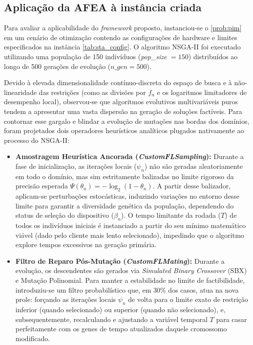 \subsection{Aplicação da AFEA à instância criada}
\label{subsec:aplicacao_AFEA}

Para avaliar a aplicabilidade do \textit{framework} proposto, instanciou-se o \ref{prob:pim} em um cenário de otimização contendo as configurações de hardware e limites especificados na instância \cref{tab:sta_config}. O algoritmo NSGA-II foi executado utilizando uma população de 150 indivíduos (\textit{pop\_size} $= 150$) distribuídos ao longo de 500 gerações de evolução ($n\_gen = 500$). 

Devido à elevada dimensionalidade contínuo-discreta do espaço de busca e à não-linearidade das restrições (como as divisões por $f_n$ e os logaritmos limitadores de desempenho local), observou-se que algoritmos evolutivos multivariáveis puros tendem a apresentar uma vasta dispersão na geração de soluções factíveis. Para contornar esse gargalo e blindar a evolução de mutações nas bordas dos domínios, foram projetados dois operadores heurísticos analíticos plugados nativamente ao processo do NSGA-II:

\begin{itemize}
    \item \textbf{Amostragem Heurística Ancorada (\textit{CustomFLSampling}):} Durante a fase de inicialização, as iterações locais ($\psi_n$) não são geradas aleatoriamente em todo o domínio, mas sim estritamente balizadas no limite rigoroso da precisão esperada $\Psi(\theta_n) = -\log_2(1-\theta_n)$. A partir desse balizador, aplicam-se perturbações estocásticas, induzindo variações no entorno desse limite para garantir a diversidade genética da população, dependendo do status de seleção do dispositivo ($\beta_n$). O tempo limitante da rodada ($T$) de todos os indivíduos iniciais é instanciado a partir do seu mínimo matemático viável (dado pelo cliente mais lento selecionado), impedindo que o algoritmo explore tempos excessivos na geração primária.
    \item \textbf{Filtro de Reparo Pós-Mutação (\textit{CustomFLMating}):} Durante a evolução, os descendentes são gerados via \textit{Simulated Binary Crossover} (SBX) e Mutação Polinomial. Para manter a estabilidade no limite de factibilidade, introduziu-se um filtro probabilístico que, em 30\% dos casos, atua na nova prole: forçando as iterações locais $\psi_n$ de volta para o limite exato de restrição inferior (quando selecionado) ou superior (quando não selecionado), e, subsequentemente, recalculando e ajustando a variável temporal $T$ para casar perfeitamente com os genes de tempo atualizados daquele cromossomo modificado.
\end{itemize}

